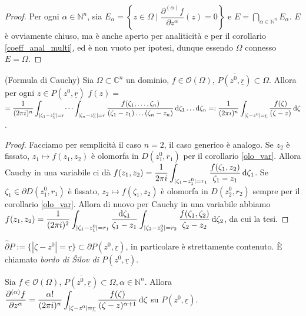 \begin{proof}
  Per ogni $\alpha \in \mathbb{N}^n$, sia $E_\alpha=\left\{z \in \Omega \mid \dfrac{\partial^{(\alpha)} f}{\partial z^\alpha}(z)=0\right\}$ e $\displaystyle E=\bigcap_{\alpha \in \mathbb{N}^n} E_\alpha$.
  $E$ è ovviamente chiuso, ma è anche aperto per analiticità e per il corollario \ref{coeff_anal_multi}, ed è non vuoto per ipotesi, dunque essendo $\Omega$ connesso $E=\Omega$.
\end{proof}

\begin{prop}
  (Formula di Cauchy) Sia $\Omega \subset \mathbb{C}^n$ un dominio, $f \in \mathcal{O}(\Omega)$, $\overline{P(z^0,\underline{r})} \subset \Omega$. Allora per ogni $z \in P(z^0, \underline{r})$ $\displaystyle f(z)=$\\
  $\displaystyle =\dfrac{1}{(2\pi i)^n} \int_{|\zeta_1-z_1^0|=r}\dots\int_{|\zeta_n-z_n^0|=r} \frac{f(\zeta_1,\dots,\zeta_n)}{(\zeta_1-z_1)\dots(\zeta_n-z_n)}\mathop{}\!\mathrm{d}\zeta_1\dots\mathop{}\!\mathrm{d}\zeta_n=: \dfrac{1}{(2\pi i)^n} \int_{|\zeta-z^0|=\underline{r}} \dfrac{f(\zeta)}{(\zeta-z)}\mathop{}\!\mathrm{d} \zeta$.
\end{prop}

\begin{proof}
  Facciamo per semplicità il caso $n=2$, il caso generico è analogo. Se $z_2$ è fissato, $z_1 \longmapsto f(z_1, z_2)$ è olomorfa in $D(z^0_1, r_1)$ per il corollario \ref{olo_var}. Allora Cauchy in una variabile ci dà $\displaystyle f(z_1,z_2)=\frac{1}{2\pi i} \int_{|\zeta_1-z^0_1|=r_1} \frac{f(\zeta_1, z_2)}{\zeta_1-z_1}\mathop{}\!\mathrm{d}\zeta_1$.
  Se $\zeta_1 \in \partial D(z^0_1, r_1)$ è fissato, $z_2 \longmapsto f(\zeta_1,z_2)$ è olomorfa in $D(z^0_2, r_2)$ sempre per il corollario \ref{olo_var}.
  Allora di nuovo per Cauchy in una variabile abbiamo $\displaystyle f(z_1, z_2)=\frac{1}{(2\pi i)^2} \int_{|\zeta_1-z_1^0|=r_1} \frac{\mathop{}\!\mathrm{d} \zeta_1}{\zeta_1-z_1}\int_{|\zeta_2-z_2^0|=r_2} \frac{f(\zeta_1,\zeta_2)}{\zeta_2-z_2}\mathop{}\!\mathrm{d}\zeta_2$, da cui la tesi.
\end{proof}

\begin{oss}
  $\hat{\partial}P:=\{|\zeta-z^0|=\underline{r}\} \subset \partial P(z^0, \underline{r})$, in particolare è strettamente contenuto. È chiamato \textit{bordo di Šilov di $P(z^0, \underline{r})$}.
\end{oss}

\begin{cor}
  Sia $f \in \mathcal{O}(\Omega)$, $\overline{P(z^0, \underline{r})} \subset \Omega, \alpha \in \mathbb{N}^n$. Allora $\displaystyle \frac{\partial^{(\alpha)} f}{\partial z^\alpha}=\dfrac{\alpha!}{(2\pi i)^n} \int_{|\zeta-z^0|=\underline{r}} \frac{f(\zeta)}{(\zeta-z)^{\alpha+1}}\mathop{}\!\mathrm{d} \zeta$ su $P(z^0, \underline{r})$.
\end{cor}

